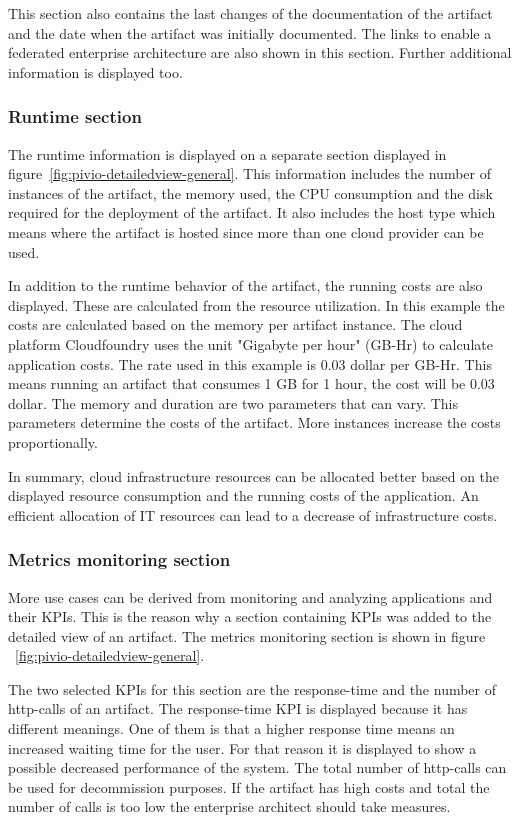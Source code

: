 This section also contains the last changes of the documentation of the artifact and the date when the artifact was initially documented. The links to enable a federated enterprise architecture are also shown in this section. Further additional information is displayed too.

\subsubsection{Runtime section}

The runtime information is displayed on a separate section displayed in figure~\ref{fig:pivio-detailedview-general}. This information includes the number of instances of the artifact, the memory used, the CPU consumption and the disk required for the deployment of the artifact. It also includes the host type which means where the artifact is hosted since more than one cloud provider can be used.

In addition to the runtime behavior of the artifact, the running costs are also displayed. These are calculated from the resource utilization. In this example the costs are calculated based on the memory per artifact instance. The cloud platform 
Cloudfoundry uses the unit "Gigabyte per hour" (GB-Hr) to calculate application costs. The rate used in this example is 0.03 dollar per GB-Hr. This means running an artifact that consumes 1 GB for 1 hour, the cost will be 0.03 dollar. The memory and duration are two parameters that can vary. This parameters determine the costs of the artifact. More instances increase the costs proportionally.

In summary, cloud infrastructure resources can be allocated better based on the displayed resource consumption and the running costs of the application. An efficient allocation of IT resources can lead to a decrease of infrastructure costs.

\subsubsection{Metrics monitoring section}

More use cases can be derived from monitoring and analyzing applications and their KPIs. \cite{Rabl2012} This is the reason why a section containing KPIs was added to the detailed view of an artifact. The metrics monitoring section is shown in figure ~\ref{fig:pivio-detailedview-general}.

The two selected KPIs for this section are the response-time and the number of http-calls of an artifact. The response-time KPI is displayed because it has different meanings. One of them is that a higher response time means an increased waiting time for the user. For that reason it is displayed to show a possible decreased performance of the system.
The total number of http-calls can be used for decommission purposes. If the artifact has high costs and total the number of calls is too low the enterprise architect should take measures.


